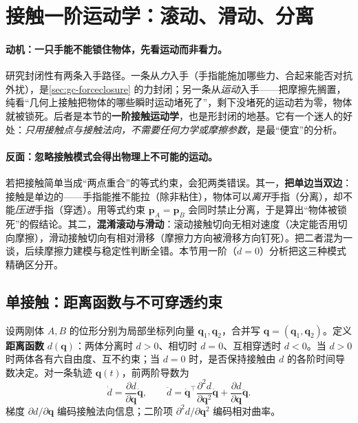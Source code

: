 \section{接触一阶运动学：滚动、滑动、分离}
\label{sec:gc-contactkin}

\paragraph{动机：一只手能不能锁住物体，先看运动而非看力。}
研究封闭性有两条入手路径。一条从\emph{力}入手（手指能施加哪些力、合起来能否对抗外扰），是\cref{sec:gc-forceclosure} 的力封闭；另一条从\emph{运动}入手——把摩擦先搁置，纯看“几何上接触把物体的哪些瞬时运动堵死了”，剩下没堵死的运动若为零，物体就被锁死。后者是本节的\textbf{一阶接触运动学}，也是形封闭的地基。它有一个迷人的好处：\emph{只用接触点与接触法向，不需要任何力学或摩擦参数}，是最“便宜”的分析。

\paragraph{反面：忽略接触模式会得出物理上不可能的运动。}
若把接触简单当成“两点重合”的等式约束，会犯两类错误。其一，\textbf{把单边当双边}：接触是单边的——手指能推不能拉（除非粘住），物体可以\emph{离开}手指（分离），却不能\emph{压进}手指（穿透）。用等式约束 $\mathbf{p}_A=\mathbf{p}_B$ 会同时禁止分离，于是算出“物体被锁死”的假结论。其二，\textbf{混淆滚动与滑动}：滚动接触切向无相对速度（决定能否用切向摩擦），滑动接触切向有相对滑移（摩擦力方向被滑移方向钉死）。把二者混为一谈，后续摩擦力建模与稳定性判断全错。本节用一阶（$\dot d=0$）分析把这三种模式精确区分开。

\subsection{单接触：距离函数与不可穿透约束}
\label{sec:gc-contact-single}

设两刚体 $A,B$ 的位形分别为局部坐标列向量 $\mathbf{q}_1,\mathbf{q}_2$，合并写 $\mathbf{q}=(\mathbf{q}_1,\mathbf{q}_2)$。定义\textbf{距离函数} $d(\mathbf{q})$：两体分离时 $d>0$、相切时 $d=0$、互相穿透时 $d<0$\cite{lynch2017modern}。当 $d>0$ 时两体各有六自由度、互不约束；当 $d=0$ 时，是否保持接触由 $d$ 的各阶时间导数决定。对一条轨迹 $\mathbf{q}(t)$，前两阶导数为
\begin{equation}
  \dot d=\frac{\partial d}{\partial\mathbf{q}}\dot{\mathbf{q}},
  \qquad
  \ddot d=\dot{\mathbf{q}}^\top\frac{\partial^2 d}{\partial\mathbf{q}^2}\dot{\mathbf{q}}+\frac{\partial d}{\partial\mathbf{q}}\ddot{\mathbf{q}}.
  \label{eq:gc-d-derivs}
\end{equation}
梯度 $\partial d/\partial\mathbf{q}$ 编码接触法向信息；二阶项 $\partial^2 d/\partial\mathbf{q}^2$ 编码相对曲率。

